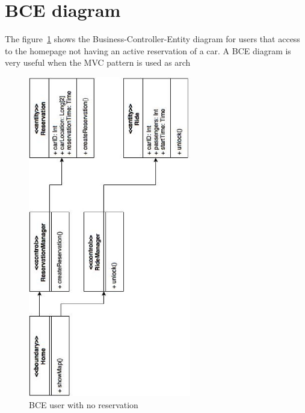 \clearpage
\section{BCE diagram}
The figure~\ref{fig:bce_diagram} shows the Business-Controller-Entity diagram for users that access to the homepage not having an active reservation of a car. A BCE diagram is very useful when the MVC pattern is used as arch
\begin{figure}[h]
	\centering
	\includegraphics[height=14cm,keepaspectratio]{figures/bce_diagram.eps}
	\caption{BCE user with no reservation}
	\label{fig:bce_diagram}
\end{figure}
